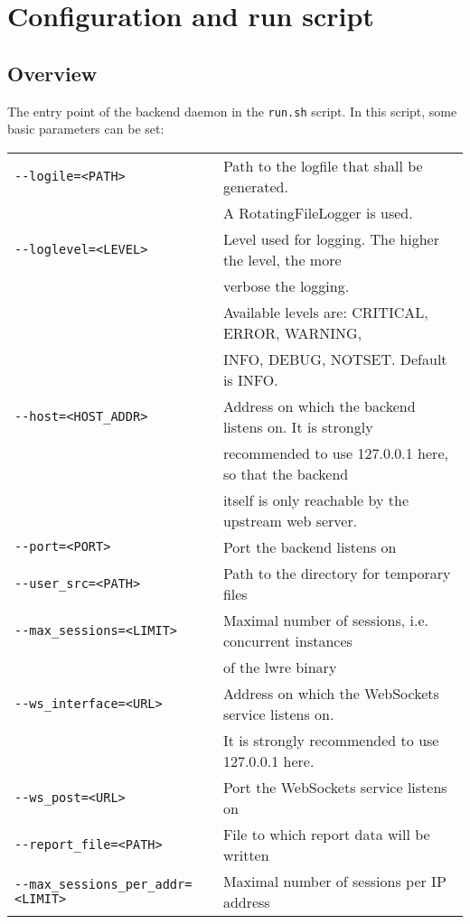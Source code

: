 \section{Configuration and run script}
\subsection{Overview}
\label{section:config}
The entry point of the backend daemon in the \verb|run.sh| script. In this script, some basic
parameters can be set:

\begin{tabular}{@{}l l}
\verb|--logile=<PATH>|                          & Path to the logfile that shall be generated.\\
                                                             & A RotatingFileLogger is used.\\
\verb|--loglevel=<LEVEL>|                       & Level used for logging. The higher the level, the more\\
                                                             & verbose the logging.\\
                                                             & Available levels are: CRITICAL, ERROR, WARNING,\\
                                                             & INFO, DEBUG, NOTSET. Default is INFO.\\
\verb|--host=<HOST_ADDR>|        & Address on which the backend listens on. It is strongly\\
                                                             & recommended to use 127.0.0.1 here, so that the backend\\
                                                             &  itself is only reachable by the upstream web server.\\
\verb|--port=<PORT>|                           & Port the backend listens on\\
\verb|--user_src=<PATH>|         & Path to the directory for temporary files\\
\verb|--max_sessions=<LIMIT>|  & Maximal number of sessions, i.e. concurrent instances\\
                                                             & of the lwre binary\\
\verb|--ws_interface=<URL>|      & Address on which the WebSockets service listens on.\\
                                                             & It is strongly recommended to use 127.0.0.1 here.\\
\verb|--ws_post=<URL>|           & Port the WebSockets service listens on\\
\verb|--report_file=<PATH>|           & File to which report data will be written\\
\verb|--max_sessions_per_addr=<LIMIT>|           & Maximal number of sessions per IP address\\
\end{tabular}

